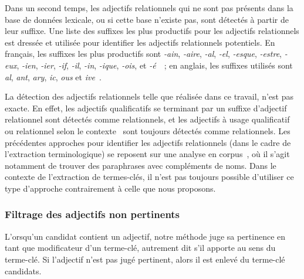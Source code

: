         Dans un second temps, les adjectifs relationnels qui ne sont pas
        présents dans la base de données lexicale, ou si cette base n'existe
        pas, sont détectés à partir de leur suffixe. Une liste des suffixes les
        plus productifs pour les adjectifs relationnels est dressée et utilisée
        pour identifier les adjectifs relationnels potentiels. En français, les
        suffixes les plus productifs sont \textit{-ain}, \textit{-aire},
        \textit{-al}, \textit{-el}, \textit{-esque}, \textit{-estre},
        \textit{-eux}, \textit{-ien}, \textit{-ier}, \textit{-if}, \textit{-il},
        \textit{-in}, \textit{-ique}, \textit{-ois}, et
        \textit{-é}~\cite{guyon1993adjectifsrelationnels}~; en anglais, les
        suffixes utilisés sont \textit{al}, \textit{ant},
        \textit{ary}, \textit{ic}, \textit{ous} et
        \textit{ive}~\cite{grabar2006terminologystructuring}.

        La détection des adjectifs relationnels telle que réalisée dans ce
        travail, n'est pas exacte. En effet, les adjectifs qualificatifs se
        terminant par un suffixe d'adjectif relationnel sont détectés comme
        relationnels, et les adjectifs à usage qualificatif ou relationnel selon
        le contexte~\cite{maniez2009denominaladjectives} sont toujours détectés
        comme relationnels. Les précédentes
        approches pour identifier les adjectifs relationnels (dans le cadre de
        l'extraction terminologique) se reposent sur une analyse en
        corpus~\cite{daille2001relationaladjectives,maniez2005automaticrelationaladjectiveidentification,harastani2013relationaladjectivetranslation},
        où il s'agit notamment de trouver des paraphrases avec compléments de
        noms. Dans le contexte de l'extraction de termes-clés, il n'est pas
        toujours possible d'utiliser ce type d'approche contrairement à celle
        que nous proposons.

      \subsubsection{Filtrage des adjectifs non pertinents}
      \label{subsubsec:main-automatic_keyphrase_annotation-keyphrase_candidate_selection-modifiers_filtering-adjective_filtering}
        L'orsqu'un candidat contient un adjectif, notre méthode juge sa
        pertinence en tant que modificateur d'un terme-clé, autrement dit s'il
        apporte au sens du terme-clé. Si l'adjectif n'est pas jugé pertinent,
        alors il est enlevé du terme-clé candidats.

